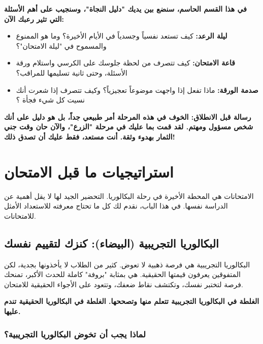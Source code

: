 \documentclass[12pt,a4paper]{book}
\newcommand{\importantAr}[1]{%
	\begin{important}
		\bfseries #1
	\end{important}
}
\begin{document}
\textbf{في هذا القسم الحاسم، سنضع بين يديك "دليل النجاة"، وسنجيب على أهم الأسئلة التي تثير رعبك الآن:}

\begin{itemize}
	
	\item \textbf{ليلة الرعد:} كيف تستعد نفسياً وجسدياً في الأيام الأخيرة؟ وما هو الممنوع والمسموح في "ليلة الامتحان"؟
	
	\item \textbf{قاعة الامتحان:} كيف تتصرف من لحظة جلوسك على الكرسي واستلام ورقة الأسئلة، وحتى ثانية تسليمها للمراقب؟
	
	\item \textbf{صدمة الورقة:} ماذا تفعل إذا واجهت موضوعاً تعجيزياً؟ وكيف تتصرف إذا شعرت أنك نسيت كل شيء فجأة ؟
	
\end{itemize}



\importantAr{رسالة قبل الانطلاق: الخوف في هذه المرحلة أمر طبيعي جداً، بل هو دليل على أنك شخص مسؤول ومهتم. لقد قمت بما عليك في مرحلة "الزرع"، والآن حان وقت جني الثمار بهدوء وثقة. أنت مستعد، فقط عليك أن تصدق ذلك!}
	
	
	
	
	\chapter{استراتيجيات ما قبل الامتحان}
	\label{chap:pre-exam}
	
	الامتحانات هي المحطة الأخيرة في رحلة البكالوريا. التحضير الجيد لها لا يقل أهمية عن الدراسة نفسها. في هذا الباب، نقدم لك كل ما تحتاج معرفته للاستعداد الأمثل للامتحانات.
	
	
	\section{البكالوريا التجريبية (البيضاء): كنزك لتقييم نفسك}
	
	البكالوريا التجريبية هي فرصة ذهبية لا تعوض. كثير من الطلاب لا يأخذونها بجدية، لكن المتفوقين يعرفون قيمتها الحقيقية. هي بمثابة "بروفة" كاملة للحدث الأكبر، تمنحك فرصة لتختبر نفسك، وتكتشف نقاط ضعفك، وتتعود على الأجواء الحقيقية للامتحان.
	
	\importantAr{الغلطة في البكالوريا التجريبية تتعلم منها وتصححها. الغلطة في البكالوريا الحقيقية تندم عليها.}
	
	\subsection{لماذا يجب أن تخوض البكالوريا التجريبية؟}
	
\end{document}
